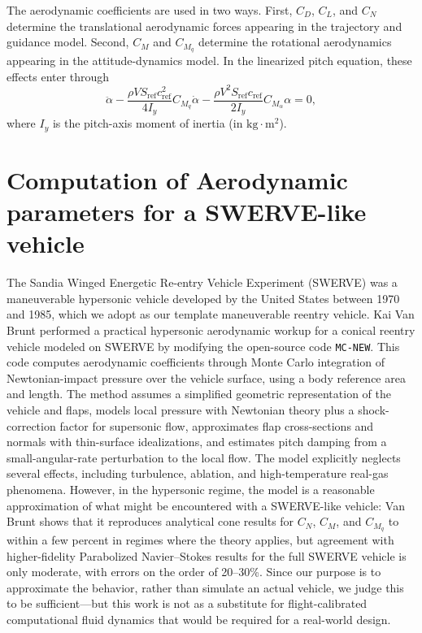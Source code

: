 The aerodynamic coefficients are used in two ways. First, \(C_D\), \(C_L\), and \(C_N\) determine the translational aerodynamic forces appearing in the trajectory and guidance model. Second, \(C_M\) and \(C_{M_q}\) determine the rotational aerodynamics appearing in the attitude-dynamics model. In the linearized pitch equation, these effects enter through
\begin{equation}
\ddot{\alpha}
-
\frac{\rho V S_{\mathrm{ref}} c_{\mathrm{ref}}^2}{4I_y} C_{M_q}\dot{\alpha}
-
\frac{\rho V^2 S_{\mathrm{ref}} c_{\mathrm{ref}}}{2I_y} C_{M_\alpha}\alpha
= 0, \label{eq:linear_pitch}
\end{equation}
where \(I_y\) is the pitch-axis moment of inertia (in \(\mathrm{kg\cdot m^2}\)).


\section{Computation of Aerodynamic parameters for a SWERVE-like vehicle}
The Sandia Winged Energetic Re-entry Vehicle Experiment (SWERVE) was a maneuverable hypersonic vehicle developed by the United States between 1970 and 1985, which we adopt as our template maneuverable reentry vehicle. Kai Van Brunt performed a practical hypersonic aerodynamic workup for a conical reentry vehicle modeled on SWERVE by modifying the open-source code \texttt{MC-NEW}. This code computes aerodynamic coefficients through Monte Carlo integration of Newtonian-impact pressure over the vehicle surface, using a body reference area and length. The method assumes a simplified geometric representation of the vehicle and flaps, models local pressure with Newtonian theory plus a shock-correction factor for supersonic flow, approximates flap cross-sections and normals with thin-surface idealizations, and estimates pitch damping from a small-angular-rate perturbation to the local flow. The model explicitly neglects several effects, including turbulence, ablation, and high-temperature real-gas phenomena. However, in the hypersonic regime, the model is a reasonable approximation of what might be encountered with a SWERVE-like vehicle: Van Brunt shows that it reproduces analytical cone results for \(C_N\), \(C_M\), and \(C_{M_q}\) to within a few percent in regimes where the theory applies, but agreement with higher-fidelity Parabolized Navier–Stokes results for the full SWERVE vehicle is only moderate, with errors on the order of 20--30\%. Since our purpose is to approximate the behavior, rather than simulate an actual vehicle, we judge this to be sufficient---but this work is not as a substitute for flight-calibrated computational fluid dynamics that would be required for a real-world design. 

